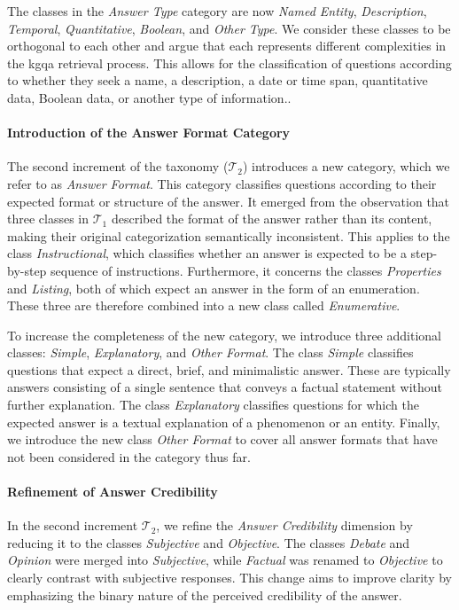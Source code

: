 The classes in the \emph{Answer Type} category are now \emph{Named Entity}, \emph{Description}, \emph{Temporal}, \emph{Quantitative}, \emph{Boolean}, and \emph{Other Type}. We consider these classes to be orthogonal to each other and argue that each represents different complexities in the \gls{kgqa} retrieval process. This allows for the classification of questions according to whether they seek a name, a description, a date or time span, quantitative data, Boolean data, or another type of information..

\paragraph{Introduction of the Answer Format Category}
The second increment of the taxonomy ($\mathcal{T}_2$) introduces a new category, which we refer to as \emph{Answer Format}. This category classifies questions according to their expected format or structure of the answer. It emerged from the observation that three classes in $\mathcal{T}_1$ described the format of the answer rather than its content, making their original categorization semantically inconsistent. This applies to the class \emph{Instructional}, which classifies whether an answer is expected to be a step-by-step sequence of instructions. Furthermore, it concerns the classes \emph{Properties} and \emph{Listing}, both of which expect an answer in the form of an enumeration. These three are therefore combined into a new class called \emph{Enumerative}.

To increase the completeness of the new category, we introduce three additional classes: \emph{Simple}, \emph{Explanatory}, and \emph{Other Format}. The class \emph{Simple} classifies questions that expect a direct, brief, and minimalistic answer. These are typically answers consisting of a single sentence that conveys a factual statement without further explanation. The class \emph{Explanatory} classifies questions for which the expected answer is a textual explanation of a phenomenon or an entity. Finally, we introduce the new class \emph{Other Format} to cover all answer formats that have not been considered in the category thus far.

\paragraph{Refinement of Answer Credibility}
In the second increment $\mathcal{T}_2$, we refine the \emph{Answer Credibility} dimension by reducing it to the classes \emph{Subjective} and \emph{Objective}. The classes \emph{Debate} and \emph{Opinion} were merged into \emph{Subjective}, while \emph{Factual} was renamed to \emph{Objective} to clearly contrast with subjective responses. This change aims to improve clarity by emphasizing the binary nature of the perceived credibility of the answer.

